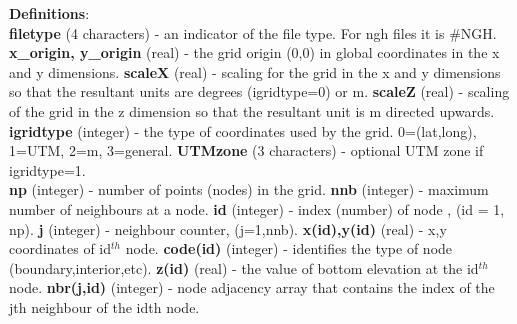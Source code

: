 \documentclass{article}
\begin{document}
\noindent\textbf{Definitions}:\\ 

\noindent
\textbf{filetype} (4 characters) - an indicator of the file type.  For ngh files it is \#NGH. \newline
\textbf{x\_origin, y\_origin} (real) - the grid origin (0,0) in global coordinates in the x and y dimensions. \newline
\textbf{scaleX} (real) - scaling for the grid in the x and y dimensions so that the resultant units are degrees (igridtype=0) or m. \newline
\textbf{scaleZ} (real) - scaling of the grid in the z dimension so that the resultant unit is m directed upwards.  \newline
\textbf{igridtype} (integer) - the type of coordinates used by the grid. 0=(lat,long), 1=UTM, 2=m, 3=general. \newline
\textbf{UTMzone} (3 characters) - optional UTM zone if igridtype=1. \\
\textbf{np} (integer) - number of points (nodes) in the grid.\newline
\textbf{nnb} (integer) - maximum number of neighbours at a node.\newline
\textbf{id} (integer) - index (number) of node , (id = 1, np). \newline
\textbf{j} (integer)   - neighbour counter, (j=1,nnb). \newline
\textbf{x(id),y(id)} (real) - x,y coordinates of id$^{th}$ node.\newline
\textbf{code(id)} (integer) - identifies the type of node (boundary,interior,etc).\newline
\textbf{z(id)} (real) - the value of bottom elevation at the id$^{th}$ node.\newline
\textbf{nbr(j,id)} (integer) - node adjacency array that contains the index of the jth neighbour of the idth node.\\

\end{document}
